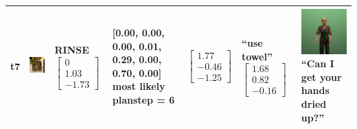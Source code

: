 \begin{longtable}{| V{0.8cm} | V{2.6cm} | V{1.6cm} | V{2.1cm} | V{1.55cm} | V{1.6cm} | V{3.2cm} |}
t7 &
\includegraphics[width=\linewidth]{fig/system/_slow2-rinse3_.jpg} &
RINSE
\linebreak\linebreak
$\begin{bmatrix}
0 \\
1.03 \\
-1.73
\end{bmatrix}$ &
[0.00, 0.00, 0.00, 0.01, 0.29, 0.00, 0.70, 0.00] most likely planstep = 6 &
$\begin{bmatrix}
1.77 \\
-0.46 \\
-1.25
\end{bmatrix}$ &
``use towel''
\linebreak\linebreak
$\begin{bmatrix}
1.68 \\
0.82 \\
-0.16
\end{bmatrix}$ &
\includegraphics[width=2.6cm]{fig/prompt/_can-i-get-your-hands-dried-up_.jpg}
\linebreak
\footnotesize
``Can I get your hands dried up?''
\\ \hline



\end{longtable}

